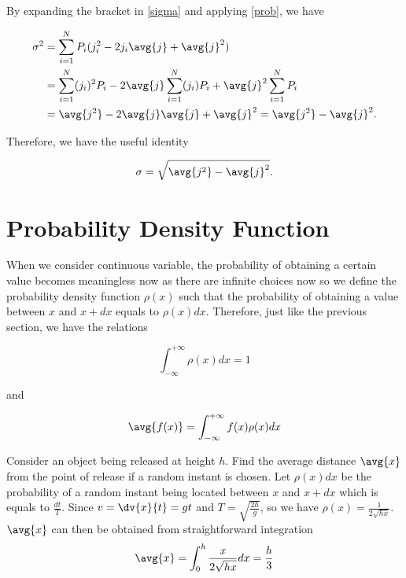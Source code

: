 \documentclass[english,a4paper,12pt]{report}
\begin{document}
By expanding the bracket in \cref{sigma} and applying \cref{prob}, we have

\begin{equation} 
	\begin{aligned} 
		\sigma^2 &= \sum_{i=1}^{N} P_i (j_i^2 - 2j_i\avg{ j } + \avg{ j }^2) \\ &= \sum_{i=1}^{N} (j_i)^2 P_i - 2 \avg{ j } \sum_{i=1}^{N} (j_i) P_i + \avg{ j }^2 \sum_{i=1}^{N} P_i \\ &= \avg{ j^2 } - 2\avg{ j } \avg{ j } + \avg{ j }^2 = \avg{ j^2 } - \avg{ j }^2. 
	\end{aligned} 
\end{equation}

Therefore, we have the useful identity

\begin{equation} 
	\sigma = \sqrt{\avg{ j^2 } - \avg{ j }^2}. 
\end{equation}
	
\section{Probability Density Function}
	
When we consider continuous variable, the probability of obtaining a certain value becomes meaningless now as there are infinite choices now so we define the probability density function \(\rho(x)\) such that the probability of obtaining a value between \(x\) and \(x + dx\) equals to \(\rho(x)dx\). Therefore, just like the previous section, we have the relations
	
\begin{equation} 
	\int_{-\infty}^{+\infty} \rho(x)dx = 1 
\end{equation}
	
and 
	
\begin{equation} 
	\avg{ f(x) } = \int_{-\infty}^{+\infty} f(x)\rho(x) dx 
\end{equation}
	
{Consider an object being released at height \(h\). Find the average distance \(\avg{x}\) from the point of release if a random instant is chosen.}
{Let \(\rho(x)dx\) be the probability of a random instant being located between \(x\) and \(x + dx\) which is equals to \(\frac{dt}{T}\). Since \(v = \dv{x}{t} = gt\) and \(T = \sqrt{\frac{2h}{g}}\), so we have \(\rho(x) = \frac{1}{2\sqrt{hx}}\).\(\avg{x}\) can then be obtained from straightforward integration 
\begin{equation} 
	\avg{x} = \int_{0}^{h} \frac{x}{2\sqrt{hx}} dx = \frac{h}{3}
\end{equation}}
\end{document}
